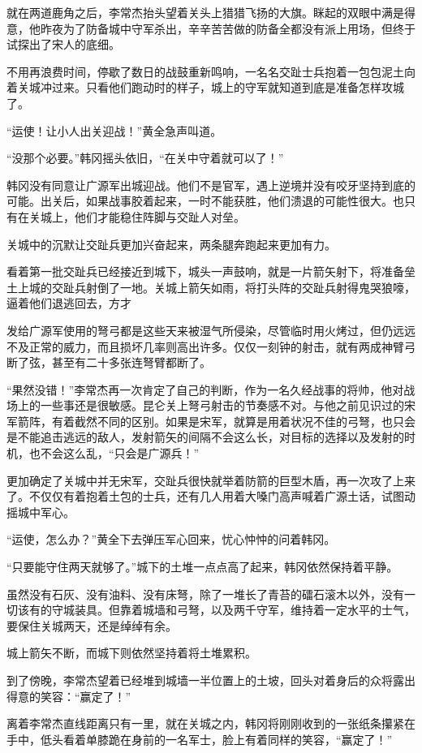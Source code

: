 就在两道鹿角之后，李常杰抬头望着关头上猎猎飞扬的大旗。眯起的双眼中满是得意，他昨夜为了防备城中守军杀出，辛辛苦苦做的防备全都没有派上用场，但终于试探出了宋人的底细。

不用再浪费时间，停歇了数日的战鼓重新鸣响，一名名交趾士兵抱着一包包泥土向着关城冲过来。只看他们跑动时的样子，城上的守军就知道到底是准备怎样攻城了。

“运使！让小人出关迎战！”黄全急声叫道。

“没那个必要。”韩冈摇头依旧，“在关中守着就可以了！”

韩冈没有同意让广源军出城迎战。他们不是官军，遇上逆境并没有咬牙坚持到底的可能。出关后，如果战事胶着起来，一时不能获胜，他们溃退的可能性很大。也只有在关城上，他们才能稳住阵脚与交趾人对垒。

关城中的沉默让交趾兵更加兴奋起来，两条腿奔跑起来更加有力。

看着第一批交趾兵已经接近到城下，城头一声鼓响，就是一片箭矢射下，将准备垒土上城的交趾兵射倒了一地。关城上箭矢如雨，将打头阵的交趾兵射得鬼哭狼嚎，逼着他们退逃回去，方才

发给广源军使用的弩弓都是这些天来被湿气所侵染，尽管临时用火烤过，但仍远远不及正常的威力，而且损坏几率则高出许多。仅仅一刻钟的射击，就有两成神臂弓断了弦，甚至有二十多张连弩臂都断了。

“果然没错！”李常杰再一次肯定了自己的判断，作为一名久经战事的将帅，他对战场上的一些事还是很敏感。昆仑关上弩弓射击的节奏感不对。与他之前见识过的宋军箭阵，有着截然不同的区别。如果是宋军，就算是用着状况不佳的弓弩，也只会是不能追击逃远的敌人，发射箭矢的间隔不会这么长，对目标的选择以及发射的时机，也不会这么乱，“只会是广源兵！”

更加确定了关城中并无宋军，交趾兵很快就举着防箭的巨型木盾，再一次攻了上来了。不仅仅有着抱着土包的士兵，还有几人用着大嗓门高声喊着广源土话，试图动摇城中军心。

“运使，怎么办？”黄全下去弹压军心回来，忧心忡忡的问着韩冈。

“只要能守住两天就够了。”城下的土堆一点点高了起来，韩冈依然保持着平静。

虽然没有石灰、没有油料、没有床弩，除了一堆长了青苔的礌石滚木以外，没有一切该有的守城装具。但靠着城墙和弓弩，以及两千守军，维持着一定水平的士气，要保住关城两天，还是绰绰有余。

城上箭矢不断，而城下则依然坚持着将土堆累积。

到了傍晚，李常杰望着已经堆到城墙一半位置上的土坡，回头对着身后的众将露出得意的笑容：“赢定了！”

离着李常杰直线距离只有一里，就在关城之内，韩冈将刚刚收到的一张纸条攥紧在手中，低头看着单膝跪在身前的一名军士，脸上有着同样的笑容，“赢定了！”

